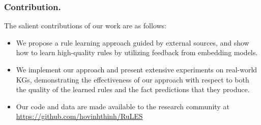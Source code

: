 \subsubsection{Contribution.}
The salient contributions of our work are as follows:
\begin{itemize}
\item We propose a rule learning approach  guided by external sources, and show how to
learn high-quality rules by utilizing feedback from embedding models.
  \item We implement our approach and present extensive experiments on real-world KGs,
demonstrating the effectiveness of our approach with respect to both 
the quality of the learned rules and the fact predictions that they produce.
\item Our code and data are made available to the research community at\\
\url{https://github.com/hovinhthinh/RuLES}
\end{itemize}

